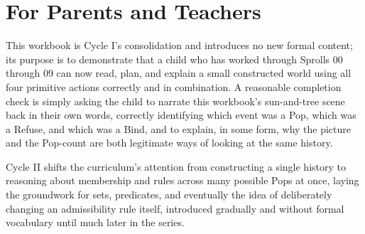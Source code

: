 \documentclass[11pt]{book}
\begin{document}
\chapter*{For Parents and Teachers}

This workbook is Cycle I's consolidation and introduces no new formal content; its purpose is to demonstrate that a child who has worked through Sprolls 00 through 09 can now read, plan, and explain a small constructed world using all four primitive actions correctly and in combination. A reasonable completion check is simply asking the child to narrate this workbook's sun-and-tree scene back in their own words, correctly identifying which event was a Pop, which was a Refuse, and which was a Bind, and to explain, in some form, why the picture and the Pop-count are both legitimate ways of looking at the same history.

Cycle II shifts the curriculum's attention from constructing a single history to reasoning about membership and rules across many possible Pops at once, laying the groundwork for sets, predicates, and eventually the idea of deliberately changing an admissibility rule itself, introduced gradually and without formal vocabulary until much later in the series.
\end{document}
